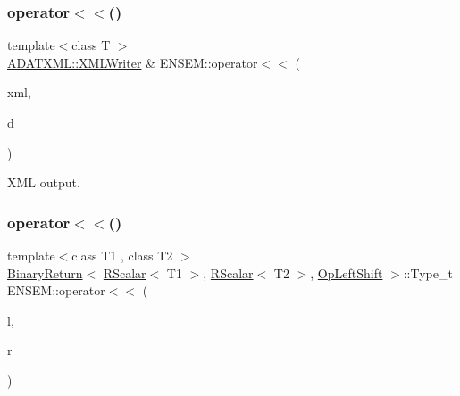 \subsubsection{\texorpdfstring{operator$<$$<$()}{operator<<()}\hspace{0.1cm}{\footnotesize\ttfamily [3/4]}}
{\footnotesize\ttfamily template$<$class T $>$ \\
\mbox{\hyperlink{classADATXML_1_1XMLWriter}{A\+D\+A\+T\+X\+M\+L\+::\+X\+M\+L\+Writer}} \& E\+N\+S\+E\+M\+::operator$<$$<$ (\begin{DoxyParamCaption}\item[{\mbox{\hyperlink{classADATXML_1_1XMLWriter}{A\+D\+A\+T\+X\+M\+L\+::\+X\+M\+L\+Writer}} \&}]{xml,  }\item[{const \mbox{\hyperlink{classENSEM_1_1RScalar}{R\+Scalar}}$<$ T $>$ \&}]{d }\end{DoxyParamCaption})\hspace{0.3cm}{\ttfamily [inline]}}



X\+ML output. 

\mbox{\label{group__rscalar_ga6cce85d32b25e3574980320d6e6bd811}} 
\subsubsection{\texorpdfstring{operator$<$$<$()}{operator<<()}\hspace{0.1cm}{\footnotesize\ttfamily [4/4]}}
{\footnotesize\ttfamily template$<$class T1 , class T2 $>$ \\
\mbox{\hyperlink{structENSEM_1_1BinaryReturn}{Binary\+Return}}$<$ \mbox{\hyperlink{classENSEM_1_1RScalar}{R\+Scalar}}$<$ T1 $>$, \mbox{\hyperlink{classENSEM_1_1RScalar}{R\+Scalar}}$<$ T2 $>$, \mbox{\hyperlink{structENSEM_1_1OpLeftShift}{Op\+Left\+Shift}} $>$\+::Type\+\_\+t E\+N\+S\+E\+M\+::operator$<$$<$ (\begin{DoxyParamCaption}\item[{const \mbox{\hyperlink{classENSEM_1_1RScalar}{R\+Scalar}}$<$ T1 $>$ \&}]{l,  }\item[{const \mbox{\hyperlink{classENSEM_1_1RScalar}{R\+Scalar}}$<$ T2 $>$ \&}]{r }\end{DoxyParamCaption})\hspace{0.3cm}{\ttfamily [inline]}}

